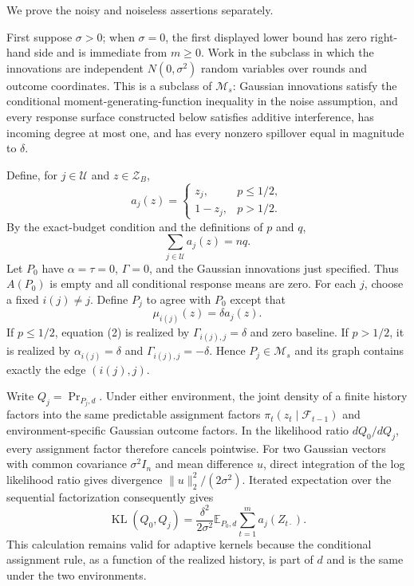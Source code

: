 We prove the noisy and noiseless assertions separately.

First suppose \(\sigma>0\); when \(\sigma=0\), the first displayed lower bound has zero right-hand side and is immediate from \(m\ge0\).  Work in the subclass in which the innovations are independent \(N(0,\sigma^2)\) random variables over rounds and outcome coordinates.  This is a subclass of \(\mathcal M_s\): Gaussian innovations satisfy the conditional moment-generating-function inequality in the noise assumption, and every response surface constructed below satisfies additive interference, has incoming degree at most one, and has every nonzero spillover equal in magnitude to \(\delta\).

Define, for \(j\in\mathcal U\) and \(z\in\mathcal Z_B\),
\[
 a_j(z)=\begin{cases}z_j,&p\le1/2,\\1-z_j,&p>1/2.\end{cases}
\]
By the exact-budget condition and the definitions of \(p\) and \(q\),
\[
 \sum_{j\in\mathcal U}a_j(z)=nq. \tag{1}
\]
Let \(P_0\) have \(\alpha=\tau=0\), \(\Gamma=0\), and the Gaussian innovations just specified.  Thus \(A(P_0)\) is empty and all conditional response means are zero.  For each \(j\), choose a fixed \(i(j)\ne j\).  Define \(P_j\) to agree with \(P_0\) except that
\[
 \mu_{i(j)}(z)=\delta a_j(z). \tag{2}
\]
If \(p\le1/2\), equation (2) is realized by \(\Gamma_{i(j),j}=\delta\) and zero baseline.  If \(p>1/2\), it is realized by \(\alpha_{i(j)}=\delta\) and \(\Gamma_{i(j),j}=-\delta\).  Hence \(P_j\in\mathcal M_s\) and its graph contains exactly the edge \((i(j),j)\).

Write \(Q_j=\Pr_{P_j,d}\).  Under either environment, the joint density of a finite history factors into the same predictable assignment factors \(\pi_t(z_t\mid\mathcal F_{t-1})\) and environment-specific Gaussian outcome factors.  In the likelihood ratio \(dQ_0/dQ_j\), every assignment factor therefore cancels pointwise.  For two Gaussian vectors with common covariance \(\sigma^2I_n\) and mean difference \(u\), direct integration of the log likelihood ratio gives divergence \(\lVert u\rVert_2^2/(2\sigma^2)\).  Iterated expectation over the sequential factorization consequently gives
\[
 \operatorname{KL}(Q_0,Q_j)
 =\frac{\delta^2}{2\sigma^2}
   \mathbb E_{P_0,d}\sum_{t=1}^m a_j(Z_{t\cdot}). \tag{3}
\]
This calculation remains valid for adaptive kernels because the conditional assignment rule, as a function of the realized history, is part of \(d\) and is the same under the two environments.

